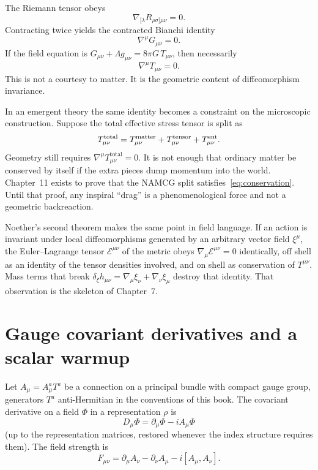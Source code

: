 The Riemann tensor obeys
\begin{equation}
  \label{eq:bianchi}
  \nabla_{[\lambda}R_{\rho\sigma]\mu\nu}=0.
\end{equation}
Contracting twice yields the contracted Bianchi identity
\begin{equation}
  \label{eq:contracted-bianchi}
  \nabla^\mu G_{\mu\nu}=0.
\end{equation}
If the field equation is \(G_{\mu\nu}+\Lambda g_{\mu\nu}=8\pi G\,T_{\mu\nu}\),
then necessarily
\begin{equation}
  \label{eq:conservation}
  \nabla^\mu T_{\mu\nu}=0.
\end{equation}
This is not a courtesy to matter. It is the geometric content of
diffeomorphism invariance.

In an emergent theory the same identity becomes a constraint on the
microscopic construction. Suppose the total effective stress tensor is
split as
\begin{equation}
  \label{eq:T-split}
  T_{\mu\nu}^{\mathrm{total}}
  =T_{\mu\nu}^{\mathrm{matter}}
  +T_{\mu\nu}^{\mathrm{tensor}}
  +T^{\mathrm{ent}}_{\mu\nu}.
\end{equation}
Geometry still requires
\(\nabla^\mu T_{\mu\nu}^{\mathrm{total}}=0\). It is not enough that
ordinary matter be conserved by itself if the extra pieces dump
momentum into the world. Chapter~11 exists to prove that the NAMCG
split satisfies~\eqref{eq:conservation}. Until that proof, any
inspiral ``drag'' is a phenomenological force and not a geometric
backreaction.

Noether's second theorem makes the same point in field language. If an
action is invariant under local diffeomorphisms generated by an
arbitrary vector field \(\xi^\mu\), the Euler--Lagrange tensor
\(\mathcal{E}^{\mu\nu}\) of the metric obeys
\(\nabla_\mu\mathcal{E}^{\mu\nu}=0\) identically, off shell as an
identity of the tensor densities involved, and on shell as conservation
of \(T^{\mu\nu}\). Mass terms that break
\(\delta_\xi h_{\mu\nu}=\nabla_\mu\xi_\nu+\nabla_\nu\xi_\mu\)
destroy that identity. That observation is the skeleton of Chapter~7.

\section{Gauge covariant derivatives and a scalar warmup}
\label{sec:ch2-gauge}

Let \(A_\mu=A_\mu^a T^a\) be a connection on a principal bundle with
compact gauge group, generators \(T^a\) anti-Hermitian in the
conventions of this book. The covariant derivative on a field \(\Phi\)
in a representation \(\rho\) is
\begin{equation}
  \label{eq:covdev}
  D_\mu\Phi=\partial_\mu\Phi-iA_\mu\Phi
\end{equation}
(up to the representation matrices, restored whenever the index
structure requires them). The field strength is
\begin{equation}
  \label{eq:fieldstrength}
  F_{\mu\nu}=\partial_\mu A_\nu-\partial_\nu A_\mu-i[A_\mu,A_\nu].
\end{equation}


